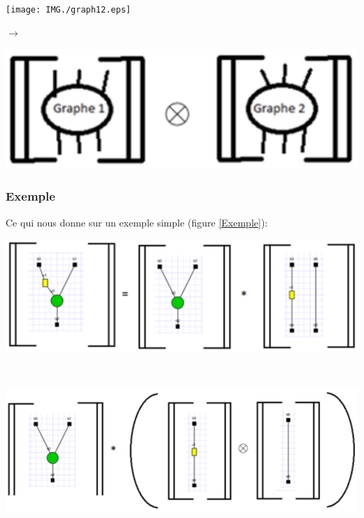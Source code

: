 \documentclass[a4paper,oneside]{book}
\begin{document}
\begin{center}
\hspace{-3cm}
\begin{minipage}[c]{0.3\textwidth}
\texttt{[image: IMG./graph12.eps]}
\end{minipage}
\hspace{1.5cm}\Huge{$\longrightarrow$}
\begin{minipage}[c]{0.3\textwidth}
\includegraphics[scale=0.9]{IMG/graph1x2.eps}
\end{minipage}
\label{produitTensoriel}
\end{center}

\subsubsection*{Exemple}
Ce qui nous donne sur un exemple simple (figure \ref{Exemple}):

\begin{center}
\centering
\begin{minipage}[c]{0.8\textwidth}
\includegraphics[scale=1]{IMG/exemple1_1.eps}
\end{minipage}
\\
\begin{minipage}[c]{0.7\textwidth}
\includegraphics[scale=1]{IMG/exemple1_2.eps}
\end{minipage}
\label{Exemple}
\end{center}
\end{document}
